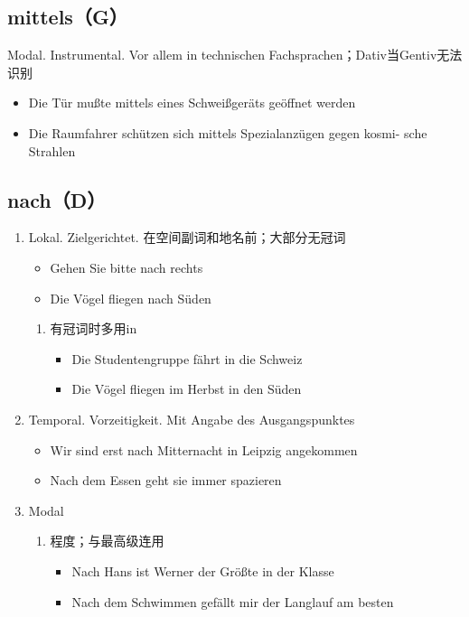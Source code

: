 \documentclass[UTF8]{report}
\begin{document}
\subsection{mittels（G）}
Modal. Instrumental. Vor allem in technischen Fachsprachen；Dativ当Gentiv无法识别
\begin{itemize}
    \item Die Tür mußte mittels eines Schweißgeräts geöffnet werden
    \item Die Raumfahrer schützen sich mittels Spezialanzügen gegen kosmi- sche Strahlen
\end{itemize}


\subsection{nach（D）}
\begin{enumerate}
    \item Lokal. Zielgerichtet. 在空间副词和地名前；大部分无冠词
    \begin{itemize}
        \item Gehen Sie bitte nach rechts
        \item Die Vögel fliegen nach Süden
    \end{itemize}
    \begin{enumerate}
        \item 有冠词时多用in
        \begin{itemize}
            \item Die Studentengruppe fährt in die Schweiz
            \item Die Vögel fliegen im Herbst in den Süden
        \end{itemize}
    \end{enumerate}
    \item Temporal. Vorzeitigkeit. Mit Angabe des Ausgangspunktes
    \begin{itemize}
        \item Wir sind erst nach Mitternacht in Leipzig angekommen
        \item Nach dem Essen geht sie immer spazieren
    \end{itemize}
    \item Modal
    \begin{enumerate}
        \item 程度；与最高级连用
        \begin{itemize}
            \item Nach Hans ist Werner der Größte in der Klasse
            \item Nach dem Schwimmen gefällt mir der Langlauf am besten

\end{itemize}
\end{enumerate}
\end{enumerate}
\end{document}
